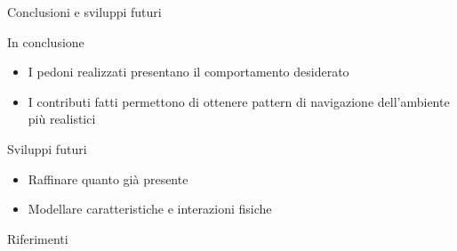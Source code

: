 \documentclass{beamer}
\begin{document}
\begin{frame}{Conclusioni e sviluppi futuri}
\begin{block}{In conclusione}
\begin{itemize}
    \item I pedoni realizzati presentano il comportamento desiderato
    \item I contributi fatti permettono di ottenere pattern di navigazione dell'ambiente più realistici
\end{itemize}{}
\end{block}
\begin{block}{Sviluppi futuri}
\begin{itemize}
    \item Raffinare quanto già presente
    \item Modellare caratteristiche e interazioni fisiche
\end{itemize}{}
\end{block}{}
\end{frame}{}

\begin{frame}{Riferimenti}
    \nocite{*}
    
    
\end{frame}
\end{document}
